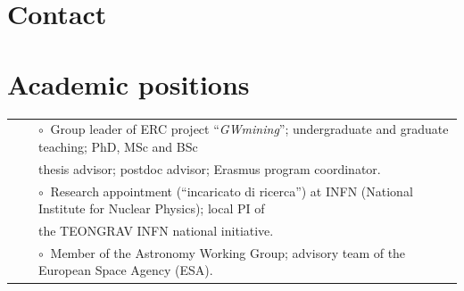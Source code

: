 



\pagestyle{headonly}

\makecvtitle


\section{Contact}



\section{Academic positions}

\vspace{-0.1cm}
\begin{tabular}{rcl}
&\hspace{0.4cm} &$\circ\;\;$Group leader of ERC project ``\textit{GWmining}''; undergraduate and graduate  teaching; PhD, MSc and BSc \\&\hspace{0.4cm} &  
\hspace{0.4cm}thesis advisor; postdoc advisor; Erasmus program coordinator.\\
&\hspace{0.4cm} &$\circ\;\;$Research appointment (``incaricato di ricerca'') at INFN (National Institute for Nuclear Physics); local PI of \\&\hspace{0.4cm} &  
\hspace{0.4cm}the TEONGRAV INFN national initiative.
\\
&\hspace{0.4cm} &$\circ\;\;$Member of the Astronomy Working Group; advisory team of the European Space Agency (ESA).
\end{tabular}
\vspace{0.2cm}

